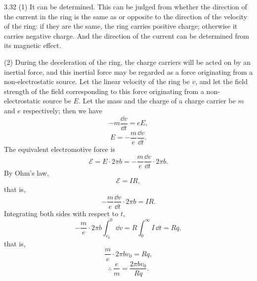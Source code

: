 \begin{solution}{3.32}
(1) It can be determined. This can be judged from whether the direction of the current in the ring is the same as or opposite to the direction of the velocity of the ring: if they are the same, the ring carries positive charge; otherwise it carries negative charge. And the direction of the current can be determined from its magnetic effect.

(2) During the deceleration of the ring, the charge carriers will be acted on by an inertial force, and this inertial force may be regarded as a force originating from a non-electrostatic source. Let the linear velocity of the ring be $v$, and let the field strength of the field corresponding to this force originating from a non-electrostatic source be $E$. Let the mass and the charge of a charge carrier be $m$ and $e$ respectively; then we have
\[
-m\frac{\dd v}{\dd t}=eE,
\]
\[
E=-\frac{m}{e}\frac{\dd v}{\dd t}.
\]
The equivalent electromotive force is
\[
\mathcal{E}=E\cdot2\pi b=-\frac{m}{e}\frac{\dd v}{\dd t}\cdot2\pi b.
\]
By Ohm's law,
\[
\mathcal{E}=IR,
\]
that is,
\[
-\frac{m}{e}\frac{\dd v}{\dd t}\cdot2\pi b=IR.
\]
Integrating both sides with respect to $t$,
\[
-\frac{m}{e}\cdot2\pi b\int_{v_0}^{0}\dd v=R\int_0^\infty I\,\dd t=Rq,
\]
that is,
\[
\frac{m}{e}\cdot2\pi bv_0=Rq,
\]
\[
\therefore\ \frac{e}{m}=\frac{2\pi bv_0}{Rq}.
\]
\end{solution}

